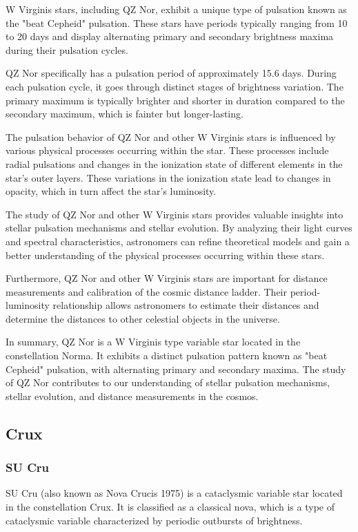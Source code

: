 W Virginis stars, including QZ Nor, exhibit a unique type of pulsation known as the "beat Cepheid" pulsation. These stars have periods typically ranging from 10 to 20 days and display alternating primary and secondary brightness maxima during their pulsation cycles.

QZ Nor specifically has a pulsation period of approximately 15.6 days. During each pulsation cycle, it goes through distinct stages of brightness variation. The primary maximum is typically brighter and shorter in duration compared to the secondary maximum, which is fainter but longer-lasting.

The pulsation behavior of QZ Nor and other W Virginis stars is influenced by various physical processes occurring within the star. These processes include radial pulsations and changes in the ionization state of different elements in the star's outer layers. These variations in the ionization state lead to changes in opacity, which in turn affect the star's luminosity.

The study of QZ Nor and other W Virginis stars provides valuable insights into stellar pulsation mechanisms and stellar evolution. By analyzing their light curves and spectral characteristics, astronomers can refine theoretical models and gain a better understanding of the physical processes occurring within these stars.

Furthermore, QZ Nor and other W Virginis stars are important for distance measurements and calibration of the cosmic distance ladder. Their period-luminosity relationship allows astronomers to estimate their distances and determine the distances to other celestial objects in the universe.

In summary, QZ Nor is a W Virginis type variable star located in the constellation Norma. It exhibits a distinct pulsation pattern known as "beat Cepheid" pulsation, with alternating primary and secondary maxima. The study of QZ Nor contributes to our understanding of stellar pulsation mechanisms, stellar evolution, and distance measurements in the cosmos.



\subsection{Crux}
\subsubsection*{ SU Cru }
SU Cru (also known as Nova Crucis 1975) is a cataclysmic variable star located in the constellation Crux. It is classified as a classical nova, which is a type of cataclysmic variable characterized by periodic outbursts of brightness.

